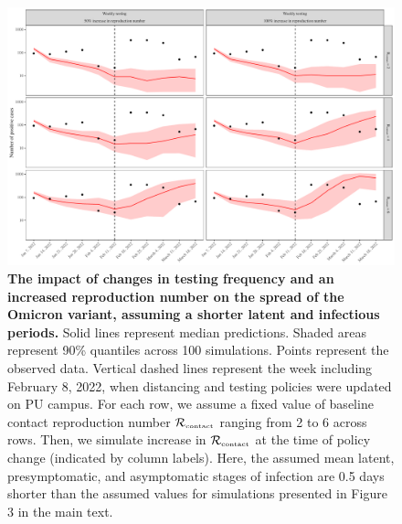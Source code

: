 \documentclass[12pt]{article}
\newcommand{\Rx}[1]{\ensuremath{{\mathcal R}_{#1}}}
\newcommand{\Rc}{\Rx{\textrm{\tiny{contact}}}}
\begin{document}
\pagebreak

\begin{figure}[!htp]
\includegraphics[width=\textwidth]{../figure_princeton_new/figure_princeton_simulation_omicron_spring_shortI.pdf}
\caption{
\textbf{The impact of changes in testing frequency and an increased reproduction number on the spread of the Omicron variant, assuming a shorter latent and infectious periods.}
Solid lines represent median predictions.
Shaded areas represent 90\% quantiles across 100 simulations.
Points represent the observed data.
Vertical dashed lines represent the week including February 8, 2022, when distancing and testing policies were updated on PU campus.
For each row, we assume a fixed value of baseline contact reproduction number $\Rc$ ranging from 2 to 6 across rows.
Then, we simulate increase in $\Rc$ at the time of policy change (indicated by column labels).
Here, the assumed mean latent, presymptomatic, and asymptomatic stages of infection are 0.5 days shorter than the assumed values for simulations presented in Figure 3 in the main text.
}
\end{figure}


\pagebreak
\end{document}
